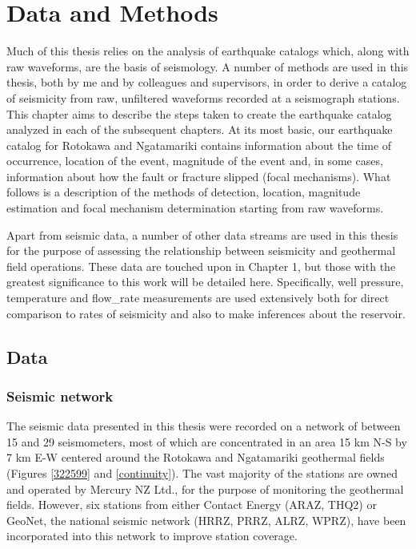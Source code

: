 \chapter{Data and Methods}
Much of this thesis relies on the analysis of earthquake catalogs which, along with raw waveforms, are the basis of seismology. A number of methods are used in this thesis, both by me and by colleagues and supervisors, in order to derive a catalog of seismicity from raw, unfiltered waveforms recorded at a seismograph stations. This chapter aims to describe the steps taken to create the earthquake catalog analyzed in each of the subsequent chapters. At its most basic, our earthquake catalog for Rotokawa and Ngatamariki contains information about the time of occurrence, location of the event, magnitude of the event and, in some cases, information about how the fault or fracture slipped (focal mechanisms). What follows is a description of the methods of detection, location, magnitude estimation and focal mechanism determination starting from raw waveforms.

Apart from seismic data, a number of other data streams are used in this thesis for the purpose of assessing the relationship between seismicity and geothermal field operations. These data are touched upon in Chapter 1, but those with the greatest significance to this work will be detailed here. Specifically, well pressure, temperature and \gls{flow_rate} measurements are used extensively both for direct comparison to rates of seismicity and also to make inferences about the reservoir. 

\section{Data}
\subsection{Seismic network}
The seismic data presented in this thesis were recorded on a network of between 15 and 29 seismometers, most of which are concentrated in an area 15 km N-S by 7 km E-W centered around the Rotokawa and Ngatamariki geothermal fields (Figures \ref{322599} and \ref{continuity}). The vast majority of the stations are owned and operated by Mercury NZ Ltd., for the purpose of monitoring the geothermal fields. However, six stations from either Contact Energy (ARAZ, THQ2) or GeoNet, the national seismic network (HRRZ, PRRZ, ALRZ, WPRZ), have been incorporated into this network to improve station coverage.

